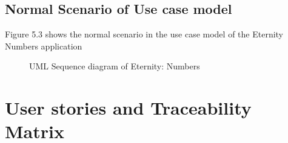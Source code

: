 \documentclass[12pt, a4paper]{report}
\begin{document}
\section{Normal Scenario of Use case model}
Figure 5.3 shows the normal scenario in the use case model of the Eternity Numbers application
\begin{figure}
    \centering
    \caption{UML Sequence diagram of Eternity: Numbers}
    \label{fig:UML Sequence diagram of Eternity: Numbers}
\end{figure}
\chapter{User stories and Traceability Matrix}
\end{document}
